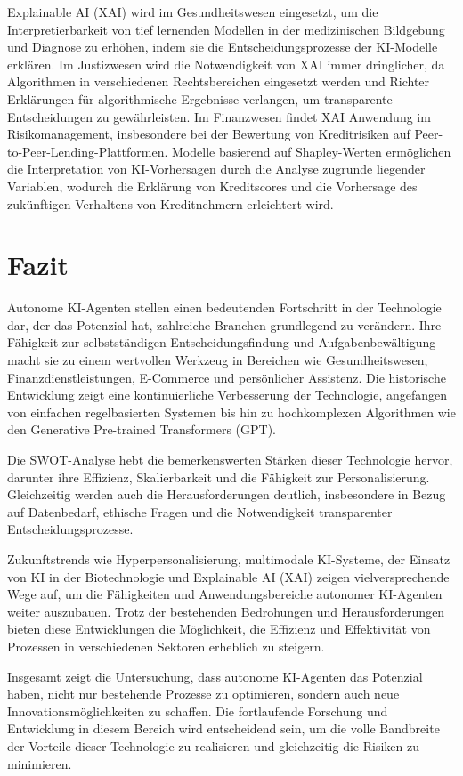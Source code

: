 \documentclass[conference]{IEEEtran}
\begin{document}
Explainable AI (XAI) wird im Gesundheitswesen eingesetzt, um die Interpretierbarkeit von tief lernenden Modellen in der medizinischen Bildgebung und Diagnose zu erhöhen, indem sie die Entscheidungsprozesse der KI-Modelle erklären\cite{peng_sensors_2023}. Im Justizwesen wird die Notwendigkeit von XAI immer dringlicher, da Algorithmen in verschiedenen Rechtsbereichen eingesetzt werden und Richter Erklärungen für algorithmische Ergebnisse verlangen, um transparente Entscheidungen zu gewährleisten\cite{deeks_judicial_2019}. Im Finanzwesen findet XAI Anwendung im Risikomanagement, insbesondere bei der Bewertung von Kreditrisiken auf Peer-to-Peer-Lending-Plattformen. Modelle basierend auf Shapley-Werten ermöglichen die Interpretation von KI-Vorhersagen durch die Analyse zugrunde liegender Variablen, wodurch die Erklärung von Kreditscores und die Vorhersage des zukünftigen Verhaltens von Kreditnehmern erleichtert wird\cite{bussmann_explainable_2020}.

\section{Fazit}

Autonome KI-Agenten stellen einen bedeutenden Fortschritt in der Technologie dar, der das Potenzial hat, zahlreiche Branchen grundlegend zu verändern. Ihre Fähigkeit zur selbstständigen Entscheidungsfindung und Aufgabenbewältigung macht sie zu einem wertvollen Werkzeug in Bereichen wie Gesundheitswesen\cite{somashekhar_watson_2018}, Finanzdienstleistungen\cite{mohanty_role_2023}, E-Commerce\cite{behera_personalized_2020} und persönlicher Assistenz\cite{madhuri_survey_2020}. Die historische Entwicklung zeigt eine kontinuierliche Verbesserung der Technologie, angefangen von einfachen regelbasierten Systemen bis hin zu hochkomplexen Algorithmen wie den Generative Pre-trained Transformers (GPT).

Die SWOT-Analyse hebt die bemerkenswerten Stärken dieser Technologie hervor, darunter ihre Effizienz, Skalierbarkeit und die Fähigkeit zur Personalisierung. Gleichzeitig werden auch die Herausforderungen deutlich, insbesondere in Bezug auf Datenbedarf, ethische Fragen und die Notwendigkeit transparenter Entscheidungsprozesse.

Zukunftstrends wie Hyperpersonalisierung, multimodale KI-Systeme, der Einsatz von KI in der Biotechnologie und Explainable AI (XAI) zeigen vielversprechende Wege auf, um die Fähigkeiten und Anwendungsbereiche autonomer KI-Agenten weiter auszubauen. Trotz der bestehenden Bedrohungen und Herausforderungen bieten diese Entwicklungen die Möglichkeit, die Effizienz und Effektivität von Prozessen in verschiedenen Sektoren erheblich zu steigern.

Insgesamt zeigt die Untersuchung, dass autonome KI-Agenten das Potenzial haben, nicht nur bestehende Prozesse zu optimieren, sondern auch neue Innovationsmöglichkeiten zu schaffen. Die fortlaufende Forschung und Entwicklung in diesem Bereich wird entscheidend sein, um die volle Bandbreite der Vorteile dieser Technologie zu realisieren und gleichzeitig die Risiken zu minimieren.



\end{document}
